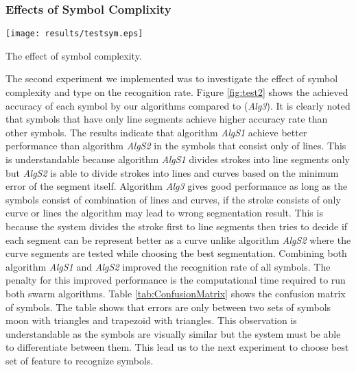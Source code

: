 \subsubsection {Effects of Symbol Complixity }
 \label{sec:EffectsofSymbolComplixity}
 
 
\begin{figure*}
	\centering
		\texttt{[image: results/testsym.eps]}
	\caption{Symbols Comparison} The effect of symbol complexity.  %
	\label{fig:test2}
\end{figure*}  
The second experiment we implemented was to investigate the effect of symbol complexity and type on the recognition rate. Figure \ref{fig:test2} shows the achieved accuracy of each symbol by our algorithms compared to \cite{earlyprocess} (\textsl{Alg3}). It is clearly noted that symbols that have only line segments achieve higher accuracy rate than other symbols. The results indicate that algorithm \textsl{AlgS1} achieve better performance than algorithm \textsl{AlgS2} in the symbols that consist only of lines. This is understandable because algorithm \textsl{AlgS1} divides strokes into line segments only but \textsl{AlgS2} is able to divide strokes into lines and curves based on the minimum error of the segment itself. Algorithm \textsl{Alg3} gives good performance as long as the symbols consist of combination of lines and curves, if the stroke consists of only curve or lines the algorithm may lead to wrong segmentation result. This is because the system divides the stroke first to line segments then tries to decide if each segment can be represent better as a curve unlike algorithm \textsl{AlgS2} where the curve segments are tested while choosing the best segmentation. Combining both algorithm \textsl{AlgS1} and \textsl{AlgS2} improved the recognition rate of all symbols. The penalty for this improved performance is the computational time required to run both swarm algorithms. Table \ref{tab:ConfusionMatrix} shows the confusion matrix of symbols. The table shows that errors are only between two sets of symbols moon with triangles and trapezoid with triangles. This observation is understandable as the symbols are visually similar but the system must be able to differentiate between them. This lead us to the next experiment to choose best set of feature to recognize symbols. 
